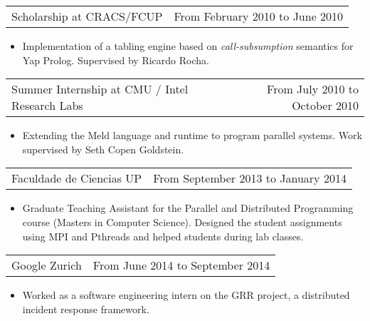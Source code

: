 \documentclass[margin]{res}
\begin{document}
\begin{resume}
                  \begin{tabular}{p{3in} r}
                    Scholarship at CRACS/FCUP & From February 2010 to June 2010
                  \end{tabular}
                  \begin{itemize}
                    \item[] Implementation of a tabling engine based on \textit{call-subsumption} semantics for Yap Prolog. Supervised by Ricardo Rocha.
                  \end{itemize}
                  
                  \begin{tabular}{p{3in} r}
                    Summer Internship at CMU / Intel Research Labs & From July 2010 to October 2010
                  \end{tabular}
                  \begin{itemize}
                    \item[] Extending the Meld language and runtime to program parallel systems. Work supervised by Seth Copen Goldstein.
                  \end{itemize}
                  \clearpage
                  
                  \begin{tabular}{p{3in} r} %
                    Faculdade de Ciencias UP &  From September 2013 to January 2014
                   \end{tabular}
                    \begin{itemize}					        
                     \item[] Graduate Teaching Assistant for the Parallel and Distributed Programming course (Masters in Computer Science). Designed the student assignments using MPI and Pthreads and helped students during lab classes.
                    \end{itemize}

                  \begin{tabular}{p{3in} r} %
                    Google Zurich &  From June 2014 to September 2014
                   \end{tabular}
                    \begin{itemize}
                      \item[] Worked as a software engineering intern on the GRR project, a distributed incident response framework.
                    \end{itemize}


\end{resume}
\end{document}
